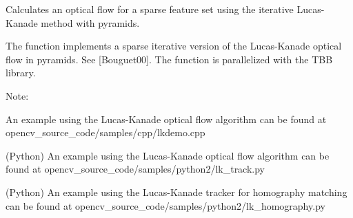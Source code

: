 Calculates an optical flow for a sparse feature set using the iterative Lucas-\/\+Kanade method with pyramids.

The function implements a sparse iterative version of the Lucas-\/\+Kanade optical flow in pyramids. See \mbox{[}Bouguet00\mbox{]}. The function is parallelized with the T\+BB library.

Note\+:


\begin{DoxyItemize}
\item An example using the Lucas-\/\+Kanade optical flow algorithm can be found at opencv\+\_\+source\+\_\+code/samples/cpp/lkdemo.\+cpp 
\item (Python) An example using the Lucas-\/\+Kanade optical flow algorithm can be found at opencv\+\_\+source\+\_\+code/samples/python2/lk\+\_\+track.\+py 
\item (Python) An example using the Lucas-\/\+Kanade tracker for homography matching can be found at opencv\+\_\+source\+\_\+code/samples/python2/lk\+\_\+homography.\+py 
\end{DoxyItemize}


